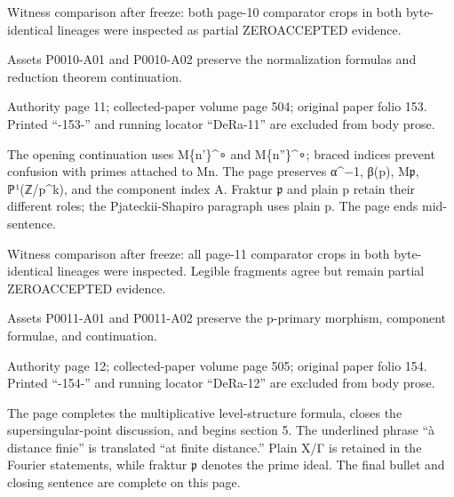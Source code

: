 \documentclass[11pt,a4paper]{article}
\begin{document}
Witness comparison after freeze: both page-10 comparator crops in both byte-identical lineages were inspected as partial ZERO\textunderscore{}ACCEPTED evidence.

Assets P0010-A01 and P0010-A02 preserve the normalization formulas and reduction theorem continuation.


\par\medskip
\hypertarget{D018-P0011}{}
\par\smallskip
Authority page 11; collected-paper volume page 504; original paper folio 153. Printed “-153-” and running locator “DeRa-11” are excluded from body prose.

The opening continuation uses M\textunderscore{}\{n'\}\textasciicircum{}∘ and M\textunderscore{}\{n''\}\textasciicircum{}∘; braced indices prevent confusion with primes attached to M\textunderscore{}n. The page preserves α\textasciicircum{}−1, β(p), M\textunderscore{}\ensuremath{\mathfrak{p}}, ℙ¹(ℤ/p\textasciicircum{}k), and the component index A. Fraktur \ensuremath{\mathfrak{p}} and plain p retain their different roles; the Pjateckii-Shapiro paragraph uses plain p. The page ends mid-sentence.

Witness comparison after freeze: all page-11 comparator crops in both byte-identical lineages were inspected. Legible fragments agree but remain partial ZERO\textunderscore{}ACCEPTED evidence.

Assets P0011-A01 and P0011-A02 preserve the p-primary morphism, component formulae, and continuation.


\par\medskip
\hypertarget{D018-P0012}{}
\par\smallskip
Authority page 12; collected-paper volume page 505; original paper folio 154. Printed “-154-” and running locator “DeRa-12” are excluded from body prose.

The page completes the multiplicative level-structure formula, closes the supersingular-point discussion, and begins section 5. The underlined phrase “à distance finie” is translated “at finite distance.” Plain X/Γ is retained in the Fourier statements, while fraktur \ensuremath{\mathfrak{p}} denotes the prime ideal. The final bullet and closing sentence are complete on this page.
\end{document}
